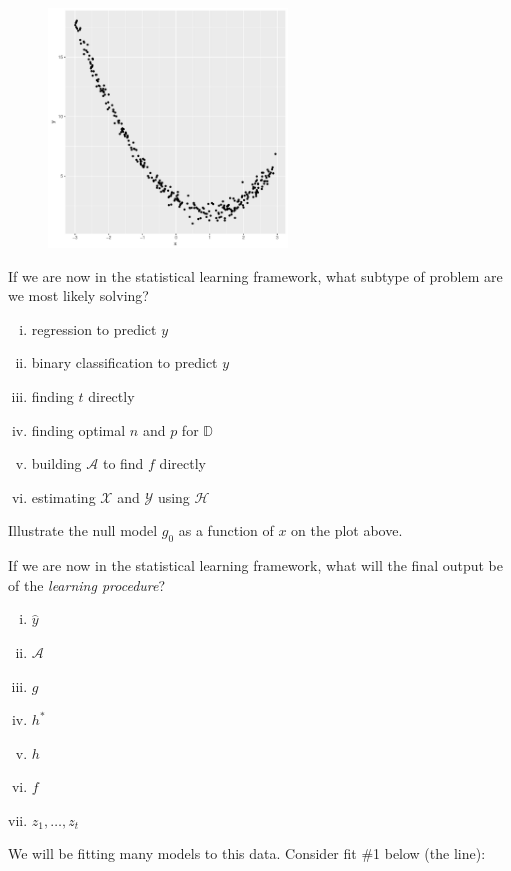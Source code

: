 \documentclass[12pt]{article}
\begin{document}
\begin{figure}[htp]
\centering
\includegraphics[width=2.5in]{curvy}
\end{figure}

\benum
{} If we are now in the statistical learning framework, what subtype of problem are we most likely solving?

\begin{enumerate}[i)]
\item regression to predict $y$
\item binary classification to predict $y$
\item finding $t$ directly
\item finding optimal $n$ and $p$ for $\mathbb{D}$
\item building $\mathcal{A}$ to find $f$ directly
\item estimating $\mathcal{X}$ and $\mathcal{Y}$ using $\mathcal{H}$
\end{enumerate}

 Illustrate the null model $g_0$ as a function of $x$ on the plot above.

 If we are now in the statistical learning framework, what will the final output be of the \emph{learning procedure}?

\begin{enumerate}[i)]
\item $\hat{y}$
\item $\mathcal{A}$
\item $g$
\item $h^*$
\item $h$
\item $f$
\item $z_1, \ldots, z_t$
\end{enumerate}
\pagebreak

\noindent We will be fitting many models to this data. Consider fit \#1 below (the line):
\end{document}
